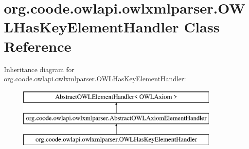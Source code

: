 \hypertarget{classorg_1_1coode_1_1owlapi_1_1owlxmlparser_1_1_o_w_l_has_key_element_handler}{\section{org.\-coode.\-owlapi.\-owlxmlparser.\-O\-W\-L\-Has\-Key\-Element\-Handler Class Reference}
\label{classorg_1_1coode_1_1owlapi_1_1owlxmlparser_1_1_o_w_l_has_key_element_handler}
}
Inheritance diagram for org.\-coode.\-owlapi.\-owlxmlparser.\-O\-W\-L\-Has\-Key\-Element\-Handler\-:\begin{figure}[H]
\begin{center}
\leavevmode
\includegraphics[height=3.000000cm]{classorg_1_1coode_1_1owlapi_1_1owlxmlparser_1_1_o_w_l_has_key_element_handler}
\end{center}
\end{figure}

